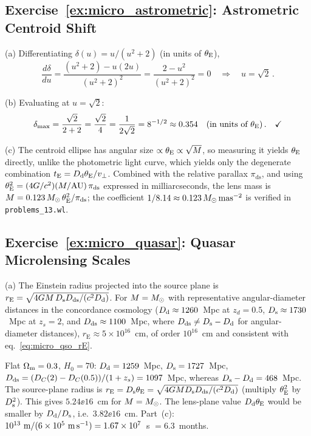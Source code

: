 \subsection*{Exercise~\ref{ex:micro_astrometric}: Astrometric Centroid Shift}

(a) Differentiating $\delta(u) = u/(u^2+2)$ (in units of $\theta_{\mathrm{E}}$),
\begin{equation*}
    \frac{d\delta}{du} = \frac{(u^2+2) - u(2u)}{(u^2+2)^2}
    = \frac{2 - u^2}{(u^2+2)^2} = 0
    \quad\Longrightarrow\quad u = \sqrt2 \,.
\end{equation*}

(b) Evaluating at $u = \sqrt2$:
\begin{equation*}
    \delta_{\max} = \frac{\sqrt2}{2 + 2} = \frac{\sqrt2}{4}
    = \frac{1}{2\sqrt2} = 8^{-1/2} \approx 0.354
    \quad(\text{in units of }\theta_{\mathrm{E}}) \,. \quad \checkmark
\end{equation*}

(c) The centroid ellipse has angular size $\propto\theta_{\mathrm{E}}
\propto\sqrt{M}$, so measuring it yields $\theta_{\mathrm{E}}$ directly, unlike the
photometric light curve, which yields only the degenerate combination
$t_{\mathrm{E}} = D_{\mathrm{d}}\theta_{\mathrm{E}}/v_\perp$.  Combined with the relative parallax
$\pi_{\mathrm{ds}}$, and using $\theta_{\mathrm{E}}^2 = (4G/c^2)
(M/\mathrm{AU})\,\pi_{\mathrm{ds}}$ expressed in milliarcseconds, the lens mass
is $M = 0.123\,M_{\odot}\,\theta_{\mathrm{E}}^2/\pi_{\mathrm{ds}}$; the coefficient
$1/8.14 \approx 0.123\,M_{\odot}\,\mathrm{mas}^{-2}$ is verified in
\texttt{problems\_13.wl}. \checkmark


\subsection*{Exercise~\ref{ex:micro_quasar}: Quasar Microlensing Scales}

(a) The Einstein radius projected into the source plane is
$r_{\mathrm{E}} = \sqrt{4G M\,D_{\mathrm{s}}D_{\mathrm{ds}}/(c^2D_{\mathrm{d}})}$.  For
$M = M_{\odot}$ with representative angular-diameter distances
in the concordance cosmology ($D_{\mathrm{d}}\approx1260$~Mpc at $z_d=0.5$,
$D_{\mathrm{s}}\approx1730$~Mpc at $z_s=2$, and $D_{\mathrm{ds}}\approx1100$~Mpc, where
$D_{\mathrm{ds}} \neq D_{\mathrm{s}} - D_{\mathrm{d}}$ for angular-diameter distances),
$r_{\mathrm{E}} \approx 5\times10^{16}$~cm, of order $10^{16}$~cm and
consistent with eq.~\eqref{eq:micro_qso_rE}. \checkmark

\begin{derivation}
Flat $\Omega_{\mathrm{m}} = 0.3$, $H_0 = 70$: $D_{\mathrm{d}} = 1259$~Mpc, $D_{\mathrm{s}} = 1727$~Mpc,
$D_{\mathrm{ds}} = (D_C(2) - D_C(0.5))/(1+z_s) = 1097$~Mpc, whereas
$D_{\mathrm{s}} - D_{\mathrm{d}} = 468$~Mpc.  The source-plane radius is
$r_{\mathrm E} = D_{\mathrm{s}}\theta_{\mathrm{E}} = \sqrt{4G MD_{\mathrm{s}}D_{\mathrm{ds}}/(c^2D_{\mathrm{d}})}$
(multiply $\theta_{\mathrm{E}}^2$ by $D_{\mathrm{s}}^2$).  This gives $5.24\ee{16}$~cm for
$M = M_{\odot}$.  The lens-plane value $D_{\mathrm{d}}\theta_{\mathrm{E}}$ would be smaller by
$D_{\mathrm{d}}/D_{\mathrm{s}}$, i.e.\ $3.82\ee{16}$~cm.  Part~(c): $10^{13}~\text{m}/(6\times 10^{5}~
\text{m\,s}^{-1}) = 1.67\times 10^{7}$~s $= 6.3$~months.
\end{derivation}

